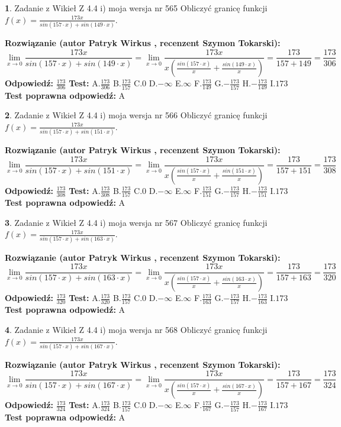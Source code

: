 \documentclass[12pt, a4paper]{article}
\theoremstyle{definition} %
\newtheorem{zad}{}
\newcommand{\zadStart}[1]{\begin{zad}#1\newline}
\newcommand{\zadStop}{\end{zad}}
\newcommand{\rozwStart}[2]{\noindent \textbf{Rozwiązanie (autor #1 , recenzent #2): }\newline}
\newcommand{\rozwStop}{\newline}
\newcommand{\odpStart}{\noindent \textbf{Odpowiedź:}\newline}
\newcommand{\odpStop}{\newline}
\newcommand{\testStart}{\noindent \textbf{Test:}\newline}
\newcommand{\testStop}{\newline}
\newcommand{\kluczStart}{\noindent \textbf{Test poprawna odpowiedź:}\newline}
\newcommand{\kluczStop}{\newline}
\begin{document}
\zadStart{Zadanie z Wikieł Z 4.4 i) moja wersja nr 565}
Obliczyć granicę funkcji $f(x)=\frac{173x}{sin(157\cdot x) +sin(149\cdot x)}$.
\zadStop
\rozwStart{Patryk Wirkus}{Szymon Tokarski}
$$\lim\limits_{x\to 0}\frac{173x}{sin(157\cdot x) +sin(149\cdot x)}=\lim\limits_{x\to 0}\frac{173x}{x(\frac{sin(157\cdot x)}{x}+\frac{sin(149\cdot x)}{x})}=\frac{173}{157+149} = \frac{173}{306}$$
\rozwStop
\odpStart
$\frac{173}{306}$
\odpStop
\testStart
A.$\frac{173}{306}$
B.$\frac{173}{157}$
C.$0$
D.$-\infty$
E.$\infty$
F.$\frac{173}{149}$
G.$-\frac{173}{157}$
H.$-\frac{173}{149}$
I.$173$
\testStop
\kluczStart
A
\kluczStop



\zadStart{Zadanie z Wikieł Z 4.4 i) moja wersja nr 566}
Obliczyć granicę funkcji $f(x)=\frac{173x}{sin(157\cdot x) +sin(151\cdot x)}$.
\zadStop
\rozwStart{Patryk Wirkus}{Szymon Tokarski}
$$\lim\limits_{x\to 0}\frac{173x}{sin(157\cdot x) +sin(151\cdot x)}=\lim\limits_{x\to 0}\frac{173x}{x(\frac{sin(157\cdot x)}{x}+\frac{sin(151\cdot x)}{x})}=\frac{173}{157+151} = \frac{173}{308}$$
\rozwStop
\odpStart
$\frac{173}{308}$
\odpStop
\testStart
A.$\frac{173}{308}$
B.$\frac{173}{157}$
C.$0$
D.$-\infty$
E.$\infty$
F.$\frac{173}{151}$
G.$-\frac{173}{157}$
H.$-\frac{173}{151}$
I.$173$
\testStop
\kluczStart
A
\kluczStop



\zadStart{Zadanie z Wikieł Z 4.4 i) moja wersja nr 567}
Obliczyć granicę funkcji $f(x)=\frac{173x}{sin(157\cdot x) +sin(163\cdot x)}$.
\zadStop
\rozwStart{Patryk Wirkus}{Szymon Tokarski}
$$\lim\limits_{x\to 0}\frac{173x}{sin(157\cdot x) +sin(163\cdot x)}=\lim\limits_{x\to 0}\frac{173x}{x(\frac{sin(157\cdot x)}{x}+\frac{sin(163\cdot x)}{x})}=\frac{173}{157+163} = \frac{173}{320}$$
\rozwStop
\odpStart
$\frac{173}{320}$
\odpStop
\testStart
A.$\frac{173}{320}$
B.$\frac{173}{157}$
C.$0$
D.$-\infty$
E.$\infty$
F.$\frac{173}{163}$
G.$-\frac{173}{157}$
H.$-\frac{173}{163}$
I.$173$
\testStop
\kluczStart
A
\kluczStop



\zadStart{Zadanie z Wikieł Z 4.4 i) moja wersja nr 568}
Obliczyć granicę funkcji $f(x)=\frac{173x}{sin(157\cdot x) +sin(167\cdot x)}$.
\zadStop
\rozwStart{Patryk Wirkus}{Szymon Tokarski}
$$\lim\limits_{x\to 0}\frac{173x}{sin(157\cdot x) +sin(167\cdot x)}=\lim\limits_{x\to 0}\frac{173x}{x(\frac{sin(157\cdot x)}{x}+\frac{sin(167\cdot x)}{x})}=\frac{173}{157+167} = \frac{173}{324}$$
\rozwStop
\odpStart
$\frac{173}{324}$
\odpStop
\testStart
A.$\frac{173}{324}$
B.$\frac{173}{157}$
C.$0$
D.$-\infty$
E.$\infty$
F.$\frac{173}{167}$
G.$-\frac{173}{157}$
H.$-\frac{173}{167}$
I.$173$
\testStop
\kluczStart
A
\kluczStop
\end{document}
